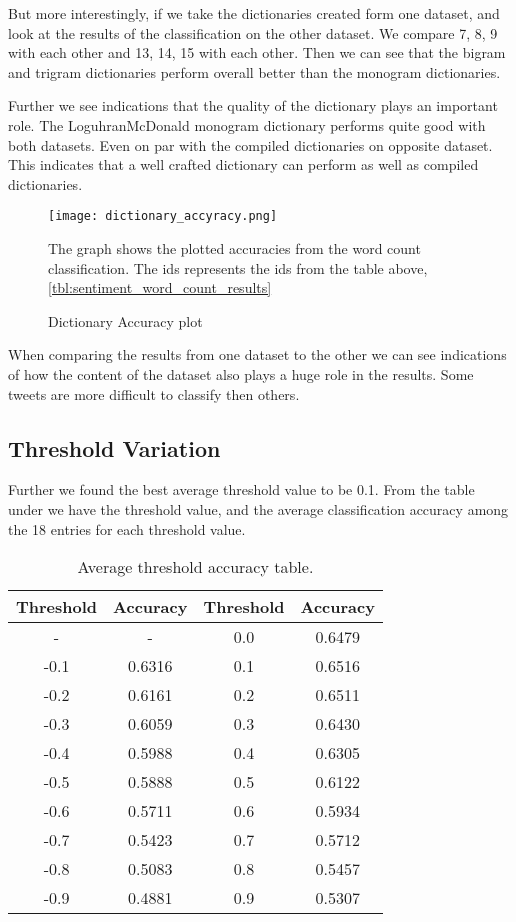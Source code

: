 But more interestingly, if we take the dictionaries created form one dataset,
and look at the results of the classification on the other dataset. We compare
7, 8, 9 with each other and 13, 14, 15 with each other. Then we can see that
the bigram and trigram dictionaries perform overall better than the monogram
dictionaries.

Further we see indications that the quality of the dictionary plays an
important role. The LoguhranMcDonald monogram dictionary performs quite good
with both datasets. Even on par with the compiled dictionaries on opposite
dataset. This indicates that a well crafted dictionary can perform as well
as compiled dictionaries.

\begin{figure}[htb]
    \centering
    \texttt{[image: dictionary\_accyracy.png]}
    \label{fig:dictionary_accyracy}
    \caption{Dictionary Accuracy plot}
The graph shows the plotted accuracies from the word count
classification. The ids represents the ids from the table above,
\ref{tbl:sentiment_word_count_results}
\end{figure}

When comparing the results from one dataset to the other we can see indications
of how the content of the dataset also plays a huge role in the results. Some
tweets are more difficult to classify then others.

\subsection{Threshold Variation}\label{results:threshold}
Further we found the best average threshold value to be 0.1.
From the table under we have the threshold value, and the average
classification accuracy among the 18 entries for each threshold value.

\begin{table}
\centering
\label{tbl:average_threshold_accuracy}
\caption{Average threshold accuracy table.}
\begin{tabular}{ c c c c }
Threshold & Accuracy & Threshold & Accuracy \\
\hline
- & - & 0.0 & 0.6479 \\
-0.1 & 0.6316 & 0.1 & 0.6516 \\
-0.2 & 0.6161 & 0.2 & 0.6511 \\
-0.3 & 0.6059 & 0.3 & 0.6430 \\
-0.4 & 0.5988 & 0.4 & 0.6305 \\
-0.5 & 0.5888 & 0.5 & 0.6122 \\
-0.6 & 0.5711 & 0.6 & 0.5934 \\
-0.7 & 0.5423 & 0.7 & 0.5712 \\
-0.8 & 0.5083 & 0.8 & 0.5457 \\
-0.9 & 0.4881 & 0.9 & 0.5307 \\
\end{tabular}
\end{table}

